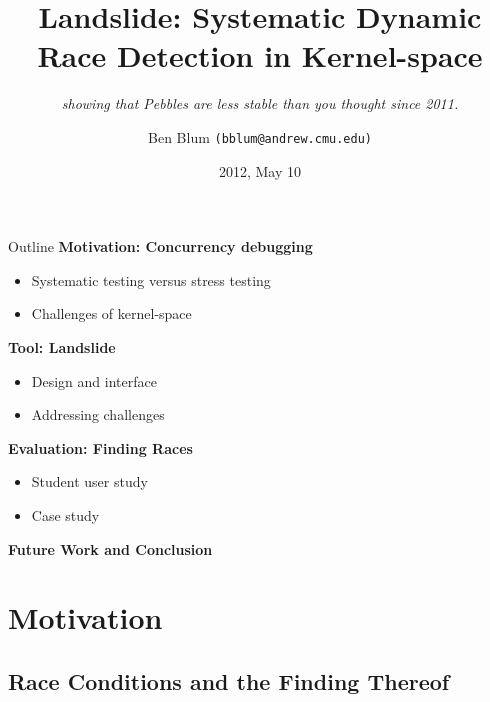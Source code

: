 \documentclass[xcolor=dvipsnames]{beamer}
\title[Landslide]{{\bf Landslide: Systematic Dynamic Race Detection in Kernel-space}}
\subtitle[]{ {\em showing that Pebbles are less stable than you thought since 2011.}}
\author[Ben Blum]{Ben Blum \texttt{(bblum@andrew.cmu.edu)}}
\institute[CMU]{Carnegie Mellon University}
\date[]{2012, May 10}
\begin{document}
\normalem
\begin{frame}
	\titlepage
\end{frame}


\newcommand\linegap{\vspace{0.2in}}
\newcommand\breakslide[1]{\begin{frame}{} \begin{center} #1 \end{center} \end{frame}}
\newcommand\related[1]{\textsuperscript{\em [#1]}}

\begin{frame}{Outline}
	\textbf{Motivation: Concurrency debugging}
	\begin{itemize}
		\item Systematic testing versus stress testing
		\item Challenges of kernel-space
	\end{itemize}
	\linegap

	{\bf Tool: Landslide}
	\begin{itemize}
		\item Design and interface
		\item Addressing challenges
	\end{itemize}
	\linegap

	{\bf Evaluation: Finding Races}
	\begin{itemize}
		\item Student user study
		\item Case study
	\end{itemize}
	\linegap

	{\bf Future Work and Conclusion}
\end{frame}

\section{Motivation}

\subsection{Race Conditions and the Finding Thereof}
\end{document}
